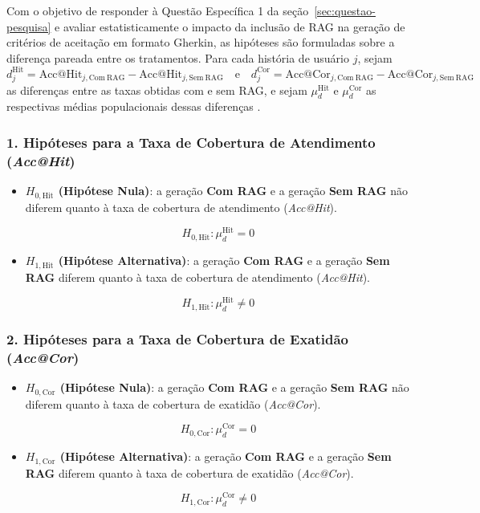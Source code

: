 Com o objetivo de responder à Questão Específica 1 da seção~\ref{sec:questao-pesquisa} e avaliar estatisticamente o impacto da inclusão de RAG na geração de critérios de aceitação em formato Gherkin, as hipóteses são formuladas sobre a diferença pareada entre os tratamentos. Para cada história de usuário $j$, sejam
\[
d_j^{\mathrm{Hit}} = \mathrm{Acc@Hit}_{j,\mathrm{Com\ RAG}} - \mathrm{Acc@Hit}_{j,\mathrm{Sem\ RAG}}
\quad \mathrm{e} \quad
d_j^{\mathrm{Cor}} = \mathrm{Acc@Cor}_{j,\mathrm{Com\ RAG}} - \mathrm{Acc@Cor}_{j,\mathrm{Sem\ RAG}}
\]
as diferenças entre as taxas obtidas com e sem RAG, e sejam $\mu_d^{\mathrm{Hit}}$ e $\mu_d^{\mathrm{Cor}}$ as respectivas médias populacionais dessas diferenças \cite{wohlin2000}.

\subsubsection*{1. Hipóteses para a Taxa de Cobertura de Atendimento (\textit{Acc@Hit})}

\begin{itemize}
    \item \textbf{$H_{0,\mathrm{Hit}}$ (Hipótese Nula)}: a geração \textbf{Com RAG} e a geração \textbf{Sem RAG} não diferem quanto à taxa de cobertura de atendimento (\textit{Acc@Hit}).

    \[
    H_{0,\mathrm{Hit}}: \mu_d^{\mathrm{Hit}} = 0
    \]

    \item \textbf{$H_{1,\mathrm{Hit}}$ (Hipótese Alternativa)}: a geração \textbf{Com RAG} e a geração \textbf{Sem RAG} diferem quanto à taxa de cobertura de atendimento (\textit{Acc@Hit}).

    \[
    H_{1,\mathrm{Hit}}: \mu_d^{\mathrm{Hit}} \neq 0
    \]
\end{itemize}

\subsubsection*{2. Hipóteses para a Taxa de Cobertura de Exatidão (\textit{Acc@Cor})}

\begin{itemize}
    \item \textbf{$H_{0,\mathrm{Cor}}$ (Hipótese Nula)}: a geração \textbf{Com RAG} e a geração \textbf{Sem RAG} não diferem quanto à taxa de cobertura de exatidão (\textit{Acc@Cor}).

    \[
    H_{0,\mathrm{Cor}}: \mu_d^{\mathrm{Cor}} = 0
    \]

    \item \textbf{$H_{1,\mathrm{Cor}}$ (Hipótese Alternativa)}: a geração \textbf{Com RAG} e a geração \textbf{Sem RAG} diferem quanto à taxa de cobertura de exatidão (\textit{Acc@Cor}).

    \[
    H_{1,\mathrm{Cor}}: \mu_d^{\mathrm{Cor}} \neq 0
    \]
\end{itemize}

